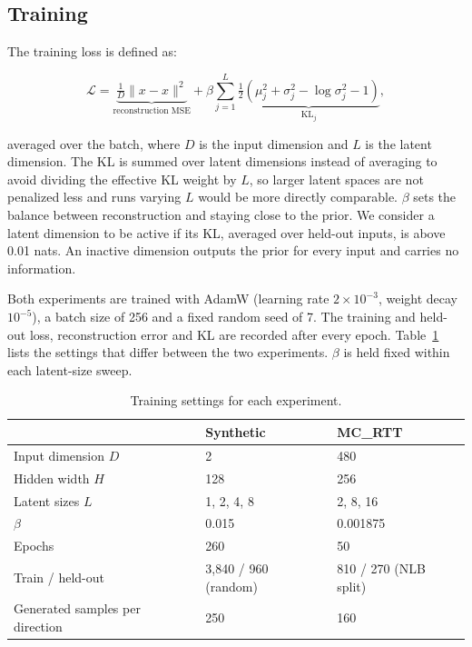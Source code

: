 \documentclass[10pt]{article}
\begin{document}
\subsection{Training}

The training loss is defined as:

$$\mathcal{L} = \underbrace{\tfrac{1}{D}\lVert x - \hat{x} \rVert^2}_{\text{reconstruction MSE}} + \beta \sum_{j=1}^{L} \underbrace{\tfrac{1}{2}\left(\mu_j^2 + \sigma_j^2 - \log\sigma_j^2 - 1\right)}_{\mathrm{KL}_j},$$

averaged over the batch, where $D$ is the input dimension and $L$ is the latent dimension.
The KL is summed over latent dimensions instead of averaging to avoid dividing the effective KL weight by $L$, so larger latent spaces are not penalized less and runs varying $L$ would be more directly comparable.
$\beta$ sets the balance between reconstruction and staying close to the prior.
We consider a latent dimension to be active if its KL, averaged over held-out inputs, is above 0.01 nats.
An inactive dimension outputs the prior for every input and carries no information.

Both experiments are trained with AdamW (learning rate $2 \times 10^{-3}$, weight decay $10^{-5}$), a batch size of 256 and a fixed random seed of 7.
The training and held-out loss, reconstruction error and KL are recorded after every epoch.
Table~\ref{tab:training_settings} lists the settings that differ between the two experiments.
$\beta$ is held fixed within each latent-size sweep.

\begin{table}[ht]
  \centering
  \small
  \caption{Training settings for each experiment.}
  \label{tab:training_settings}
  \begin{tabular}{@{}lll@{}}
    \toprule
                                 & Synthetic                       & MC\_RTT                  \\
    \midrule
    Input dimension $D$          & 2                         & 480                      \\
    Hidden width $H$             & 128                       & 256                      \\
    Latent sizes $L$             & 1, 2, 4, 8                & 2, 8, 16                 \\
    $\beta$                      & 0.015                     & 0.001875                 \\
    Epochs                       & 260                       & 50                       \\
    Train / held-out             & 3,840 / 960 (random)      & 810 / 270 (NLB split)    \\
    Generated samples per direction & 250                    & 160                      \\
    \bottomrule
  \end{tabular}
\end{table}
\end{document}
